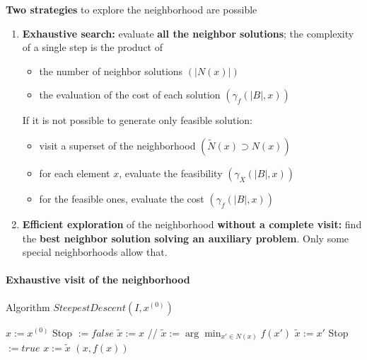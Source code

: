\documentclass[11pt]{article}
\begin{document}
	\textbf{Two strategies} to explore the neighborhood are possible
	\begin{enumerate}
		\item \textbf{Exhaustive search:} evaluate \textbf{all the neighbor solutions}; the complexity of a single step is the product of
		\begin{itemize}
			\item the number of neighbor solutions $(|N (x)|)$
			\item the evaluation of the cost of each solution $(\gamma_f (|B|, x))$
		\end{itemize}
		If it is not possible to generate only feasible solution:
		\begin{itemize}
			\item visit a superset of the neighborhood $( \tilde{N} (x) \supset N (x))$
			\item for each element $x$, evaluate the feasibility $(\gamma_X (|B|, x))$
			\item for the feasible ones, evaluate the cost $(\gamma_f (|B|, x))$
		\end{itemize}
		\nn
		
		\item \textbf{Efficient exploration} of the neighborhood \textbf{without a complete visit:} find the \textbf{best neighbor solution solving an auxiliary problem}. Only some special neighborhoods allow that.\\
	\end{enumerate}
	
	\newpage
	
	\paragraph{Exhaustive visit of the neighborhood} \nn
	
	\begin{algorithm}
		\caption{Algorithm $SteepestDescent(I , x^{(0)})$}
		\begin{algorithmic}
			\STATE $x := x^{(0)}$
			\STATE Stop $:= false$
				\STATE $ \tilde{x} := x$ // $\tilde{x} := \arg \min_{x' \in N(x)} f(x')$
							\STATE $\tilde{x} := x'$
						\ENDIF
					\ENDIF
				\ENDFOR
					\STATE Stop $ := true$
				\ELSE
					\STATE $x := \tilde{x}$
				\ENDIF
			\ENDWHILE
			\RETURN $(x, f (x))$
		\end{algorithmic}
	\end{algorithm}
	
\end{document}
